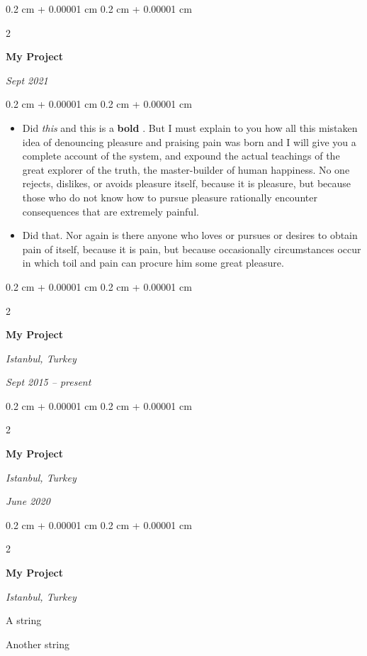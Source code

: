 \documentclass[10pt, letterpaper]{article}
\newenvironment{summary}{
    \begin{description}[
        topsep=0.10 cm,
        parsep=0.10 cm,
        partopsep=0pt,
        itemsep=0pt,
        leftmargin=0.4 cm + 10pt
    ]
}{
    \end{description}
} %
\newenvironment{highlights}{
    \begin{itemize}[
        topsep=0.10 cm,
        parsep=0.10 cm,
        partopsep=0pt,
        itemsep=0pt,
        leftmargin=0.4 cm + 10pt
    ]
}{
    \end{itemize}
} %
\newenvironment{onecolentry}{
    \begin{adjustwidth}{
        0.2 cm + 0.00001 cm
    }{
        0.2 cm + 0.00001 cm
    }
}{
    \end{adjustwidth}
} %
\newenvironment{twocolentry}[2][]{
    \onecolentry
    \def\secondColumn{#2}
    \setcolumnwidth{\fill, 4.5 cm}
    \begin{paracol}{2}
}{
    \switchcolumn \raggedleft \secondColumn
    \end{paracol}
    \endonecolentry
} %
\let\hrefWithoutArrow\href
\renewcommand{\href}[2]{\hrefWithoutArrow{#1}{\ifthenelse{\equal{#2}{}}{ }{#2 }\raisebox{.15ex}{\footnotesize \faExternalLink*}}}
\begin{document}
        \begin{twocolentry}{
            
            
        \textit{Sept 2021}}
            \textbf{My Project}
        \end{twocolentry}
        \vspace{0.10 cm}
        \begin{onecolentry}
            \begin{highlights}
                \item Did \textit{this} and this is a \textbf{bold} \href{https://example.com}{link}. But I must explain to you how all this mistaken idea of denouncing pleasure and praising pain was born and I will give you a complete account of the system, and expound the actual teachings of the great explorer of the truth, the master-builder of human happiness. No one rejects, dislikes, or avoids pleasure itself, because it is pleasure, but because those who do not know how to pursue pleasure rationally encounter consequences that are extremely painful.
                \item Did that. Nor again is there anyone who loves or pursues or desires to obtain pain of itself, because it is pain, but because occasionally circumstances occur in which toil and pain can procure him some great pleasure.
            \end{highlights}
        \end{onecolentry}


        \vspace{0.2 cm}

        \begin{twocolentry}{
        \textit{Istanbul, Turkey}    
            
        \textit{Sept 2015 – present}}
            \textbf{My Project}
        \end{twocolentry}


        \vspace{0.2 cm}

        \begin{twocolentry}{
        \textit{Istanbul, Turkey}    
            
        \textit{June 2020}}
            \textbf{My Project}
        \end{twocolentry}


        \vspace{0.2 cm}

        \begin{twocolentry}{
        \textit{Istanbul, Turkey}    
            
        }
            \textbf{My Project}
        \end{twocolentry}
            \begin{summary}
                \item A string
                \item Another string
            \end{summary}
\end{document}
